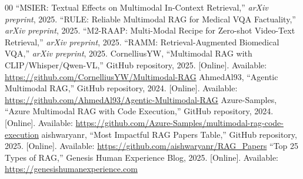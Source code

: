 \documentclass[conference]{IEEEtran}
\begin{document}
\begin{thebibliography}{00}
``MSIER: Textual Effects on Multimodal In-Context Retrieval,'' \textit{arXiv preprint}, 2025.
``RULE: Reliable Multimodal RAG for Medical VQA Factuality,'' \textit{arXiv preprint}, 2025.
``M2-RAAP: Multi-Modal Recipe for Zero-shot Video-Text Retrieval,'' \textit{arXiv preprint}, 2025.
``RAMM: Retrieval-Augmented Biomedical VQA,'' \textit{arXiv preprint}, 2025.
CornelliusYW, ``Multimodal RAG with CLIP/Whisper/Qwen-VL,'' GitHub repository, 2025. [Online]. Available: \url{https://github.com/CornelliusYW/Multimodal-RAG}
AhmedAl93, ``Agentic Multimodal RAG,'' GitHub repository, 2024. [Online]. Available: \url{https://github.com/AhmedAl93/Agentic-Multimodal-RAG}
Azure-Samples, ``Azure Multimodal RAG with Code Execution,'' GitHub repository, 2024. [Online]. Available: \url{https://github.com/Azure-Samples/multimodal-rag-code-execution}
aishwaryanr, ``Most Impactful RAG Papers Table,'' GitHub repository, 2025. [Online]. Available: \url{https://github.com/aishwaryanr/RAG_Papers}
``Top 25 Types of RAG,'' Genesis Human Experience Blog, 2025. [Online]. Available: \url{https://genesishumanexperience.com}
\end{thebibliography}
\end{document}
